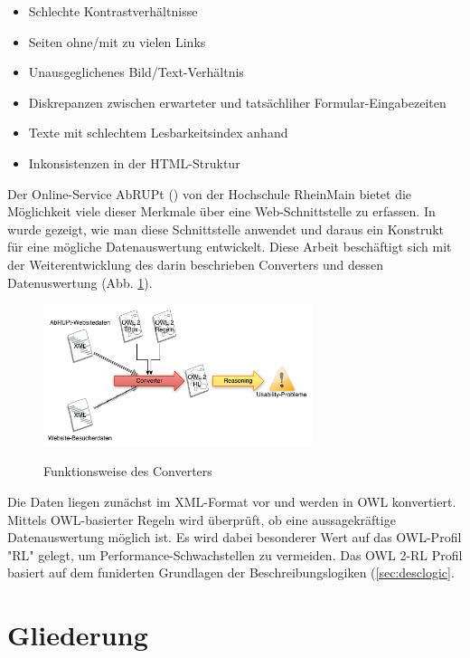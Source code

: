 \documentclass[runningheads,a4paper]{llncs}
\begin{document}
\begin{itemize}
\item{Schlechte Kontrastverhältnisse}
\item{Seiten ohne/mit zu vielen Links}
\item{Unausgeglichenes Bild/Text-Verhältnis}
\item{Diskrepanzen zwischen erwarteter und tatsächliher Formular-Eingabezeiten}
\item{Texte mit schlechtem Lesbarkeitsindex anhand \cite{lesbarkeit}}
\item{Inkonsistenzen in der HTML-Struktur}
\end{itemize}

Der Online-Service AbRUPt (\cite{abrupt}) von der Hochschule RheinMain bietet die Möglichkeit viele dieser Merkmale über eine Web-Schnittstelle zu erfassen. 
In \cite{Brieger} wurde gezeigt, wie man diese Schnittstelle anwendet und daraus ein Konstrukt für eine mögliche Datenauswertung entwickelt.
Diese Arbeit beschäftigt sich mit der Weiterentwicklung des darin beschrieben Converters und dessen Datenuswertung (Abb. \ref{fig:converter}).

\begin{figure}
\caption{Funktionsweise des Converters}
\centering
\includegraphics[width=0.7\textwidth]{figures/converter}
\label{fig:converter}
\end{figure}

Die Daten liegen zunächst im XML-Format vor und werden in OWL konvertiert.
Mittels OWL-basierter Regeln wird überprüft, ob eine aussagekräftige Datenauswertung möglich ist.
Es wird dabei besonderer Wert auf das OWL-Profil {}"RL{}" gelegt, um Performance-Schwachstellen zu vermeiden.
Das OWL 2-RL Profil basiert auf dem funiderten Grundlagen der Beschreibungslogiken (\ref{sec:desclogic}.

\section{Gliederung}
\label{sec:structure}
\end{document}
